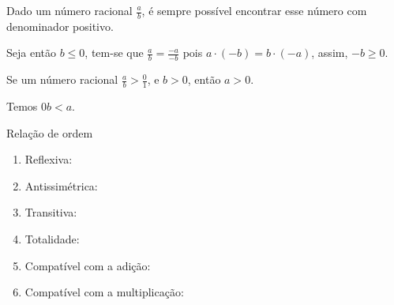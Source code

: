 \documentclass[../main.tex]{subfiles}
\begin{document}
\begin{prop}
    Dado um número racional $\frac{a}{b}$, é sempre possível encontrar esse número com denominador positivo.
\end{prop}
\begin{dem}
    Seja então $b \leq 0$, tem-se que $\frac{a}{b} = \frac{-a}{-b}$ pois $a \cdot (-b) = b \cdot (-a)$, assim, $-b \geq 0$.
\end{dem}

\begin{prop}
    Se um número racional $\frac{a}{b} > \frac{0}{1}$, e $b > 0$, então $a > 0$.
\end{prop}
\begin{dem}
    Temos $0b < a$.
\end{dem}

\begin{prop}{Relação de ordem}
    \begin{enumerate}[label=(\roman*)]
        \item Reflexiva:
        \item Antissimétrica:
        \item Transitiva:
        \item Totalidade:
        \item Compatível com a adição:
        \item Compatível com a multiplicação:
    \end{enumerate}
\end{prop}
\end{document}
